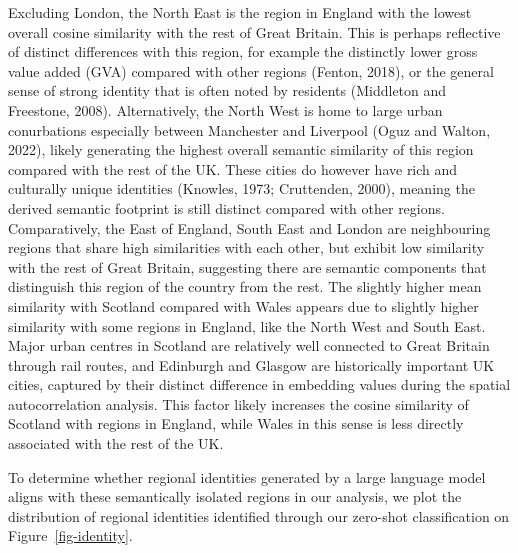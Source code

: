 \documentclass[
  letterpaper,
  11pt,
  english,
  onehalfspacing,
  headsepline]{MastersDoctoralThesis}
\begin{document}
Excluding London, the North East is the region in England with the
lowest overall cosine similarity with the rest of Great Britain. This is
perhaps reflective of distinct differences with this region, for example
the distinctly lower gross value added (GVA) compared with other regions
(Fenton, 2018), or the general sense of strong identity that is often
noted by residents (Middleton and Freestone, 2008). Alternatively, the
North West is home to large urban conurbations especially between
Manchester and Liverpool (Oguz and Walton, 2022), likely generating the
highest overall semantic similarity of this region compared with the
rest of the UK. These cities do however have rich and culturally unique
identities (Knowles, 1973; Cruttenden, 2000), meaning the derived
semantic footprint is still distinct compared with other regions.
Comparatively, the East of England, South East and London are
neighbouring regions that share high similarities with each other, but
exhibit low similarity with the rest of Great Britain, suggesting there
are semantic components that distinguish this region of the country from
the rest. The slightly higher mean similarity with Scotland compared
with Wales appears due to slightly higher similarity with some regions
in England, like the North West and South East. Major urban centres in
Scotland are relatively well connected to Great Britain through rail
routes, and Edinburgh and Glasgow are historically important UK cities,
captured by their distinct difference in embedding values during the
spatial autocorrelation analysis. This factor likely increases the
cosine similarity of Scotland with regions in England, while Wales in
this sense is less directly associated with the rest of the UK.

To determine whether regional identities generated by a large language
model aligns with these semantically isolated regions in our analysis,
we plot the distribution of regional identities identified through our
zero-shot classification on Figure~\ref{fig-identity}.
\end{document}

